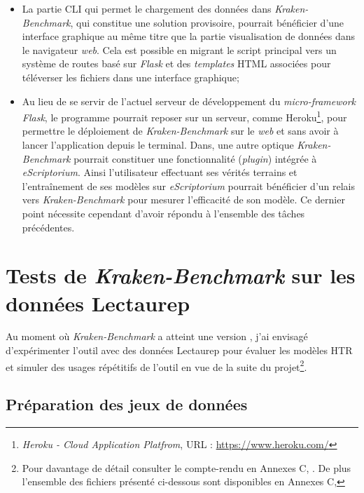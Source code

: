 \begin{itemize}
    \item La partie CLI qui permet le chargement des données dans \textit{Kraken-Benchmark}, qui constitue une solution provisoire, pourrait bénéficier d'une interface graphique au même titre que la partie visualisation de données dans le navigateur \textit{web}. Cela est possible en migrant le script principal  vers un système de routes basé sur \textit{Flask} et des \textit{templates} HTML associées pour téléverser les fichiers dans une interface graphique;
    \item Au lieu de se servir de l'actuel serveur de développement du \textit{micro-framework Flask}, le programme pourrait reposer sur un serveur, comme Heroku\footnote{\textit{Heroku - Cloud Application Platfrom}, URL : \url{https://www.heroku.com/}}, pour permettre le déploiement de \textit{Kraken-Benchmark} sur le \textit{web} et sans avoir à lancer l'application depuis le terminal. Dans, une autre optique \textit{Kraken-Benchmark} pourrait constituer une fonctionnalité (\textit{plugin}) intégrée à \textit{eScriptorium}. Ainsi l'utilisateur effectuant ses vérités terrains et l'entraînement de ses modèles sur \textit{eScriptorium} pourrait bénéficier d'un relais vers \textit{Kraken-Benchmark} pour mesurer l'efficacité de son modèle. Ce dernier point nécessite cependant d'avoir répondu à l'ensemble des tâches précédentes.
\end{itemize}
\chapter{Tests de \textit{Kraken-Benchmark} sur les données Lectaurep}\label{tests_KB_lectaurep}

Au moment où \textit{Kraken-Benchmark} a atteint une version , j'ai envisagé d'expérimenter l'outil avec des données Lectaurep pour évaluer les modèles HTR et simuler des usages répétitifs de l'outil en vue de la suite du projet\footnote{Pour davantage de détail consulter le compte-rendu en Annexes C, . De plus l'ensemble des fichiers présenté ci-dessous sont disponibles en Annexes C, }.

\section{Préparation des jeux de données} 

